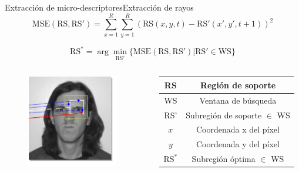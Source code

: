\documentclass{beamer}
\begin{document}
        \begin{frame}{Extracción de micro-descriptores}{Extracción de rayos}
			\begin{equation}\label{algoritmo:eq:mse}	
			    \text{MSE}(\text{RS}, \text{RS}') = \sum_{x=1}^{R} \sum_{y=1}^{R} (\text{RS}(x,y,t) - \text{RS}'(x',y', t+1))^2
		    \end{equation}   
		    
		    \begin{equation}
		        \text{RS}^* = \arg \min_{\text{RS}'}\{\text{MSE}(\text{RS},\text{RS}') | \text{RS}' \in \text{WS} \}
	        \end{equation}
	        
	        \begin{columns}[onlytextwidth]
                \begin{column}{0.5\textwidth}
					\begin{figure}[bt]
        					\centering
                			\includegraphics[width=4cm]{imagenes/MSE1.png}
            			\end{figure}      	        	
	        		\end{column}
                \begin{column}{0.5\textwidth}                
                		\begin{table}
                			
					\begin{tabular}{|c|c|}
					                \hline 
					                RS & Región de soporte \\ 
					                \hline 
					                WS & Ventana de búsqueda \\ 
					                \hline 
					                RS' & Subregión de soporte $\in$ WS \\ 
					                \hline 
					                $x$ & Coordenada x del píxel \\ 
					                \hline 
					                $y$ & Coordenada y del píxel \\ 
					                \hline 
					                $\text{RS}^*$ & Subregión óptima $\in$ WS \\
					                \hline 
					 \end{tabular} 
                		\end{table}
	        		\end{column}
	        \end{columns}	
        \end{frame}
        
\end{document}
